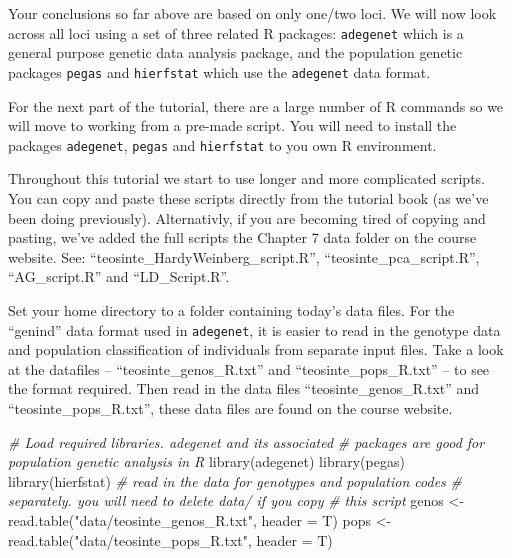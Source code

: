 \documentclass[
]{book}
\makeatletter
\newenvironment{Shaded}{\begin{snugshade}}{\end{snugshade}}
\newcommand{\AttributeTok}[1]{\textcolor[rgb]{0.77,0.63,0.00}{#1}}
\newcommand{\CommentTok}[1]{\textcolor[rgb]{0.56,0.35,0.01}{\textit{#1}}}
\newcommand{\FunctionTok}[1]{\textcolor[rgb]{0.00,0.00,0.00}{#1}}
\newcommand{\NormalTok}[1]{#1}
\newcommand{\OtherTok}[1]{\textcolor[rgb]{0.56,0.35,0.01}{#1}}
\newcommand{\StringTok}[1]{\textcolor[rgb]{0.31,0.60,0.02}{#1}}
\newenvironment{kframe}{%
\medskip{}
\setlength{\fboxsep}{.8em}
 \def\at@end@of@kframe{}%
 \ifinner\ifhmode%
  \def\at@end@of@kframe{\end{minipage}}%
  \begin{minipage}{\columnwidth}%
 \fi\fi%
 \def\FrameCommand##1{\hskip\@totalleftmargin \hskip-\fboxsep
 \colorbox{shadecolor}{##1}\hskip-\fboxsep
     \hskip-\linewidth \hskip-\@totalleftmargin \hskip\columnwidth}%
 \MakeFramed {\advance\hsize-\width
   \@totalleftmargin\z@ \linewidth\hsize
   \@setminipage}}%
 {\par\unskip\endMakeFramed%
 \at@end@of@kframe}
\newenvironment{rmdblock}[1]
  {
  \begin{itemize}
  \renewcommand{\labelitemi}{
    \raisebox{-.7\height}[0pt][0pt]{
      {\setkeys{Gin}{width=3em,keepaspectratio}\texttt{[image: images/\#1]}}
    }
  }
  \setlength{\fboxsep}{1em}
  \begin{kframe}
  \item
  }
  {
  \end{kframe}
  \end{itemize}
  }
\newenvironment{rmdnote}
  {\begin{rmdblock}{note}}
  {\end{rmdblock}}
\makeatother
\begin{document}
Your conclusions so far above are based on only one/two loci. We will now look across all loci using a set of three related R packages: \texttt{adegenet} \citep{adegenet2008} which is a general purpose genetic data analysis package, and the population genetic packages \texttt{pegas} \citep{R-pegas} and \texttt{hierfstat} \citep{R-hierfstat} which use the \texttt{adegenet} data format.

For the next part of the tutorial, there are a large number of R commands so we will move to working from a pre-made script. You will need to install the packages \texttt{adegenet}, \texttt{pegas} and \texttt{hierfstat} to you own R environment.

\begin{rmdnote}
Throughout this tutorial we start to use longer and more complicated scripts. You can copy and paste these scripts directly from the tutorial book (as we've been doing previously). Alternativly, if you are becoming tired of copying and pasting, we've added the full scripts the Chapter 7 data folder on the course website. See: ``teosinte\_HardyWeinberg\_script.R'', ``teosinte\_pca\_script.R'', ``AG\_script.R'' and ``LD\_Script.R''.
\end{rmdnote}

Set your home directory to a folder containing today's data files. For the ``genind'' data format used in \texttt{adegenet}, it is easier to read in the genotype data and population classification of individuals from separate input files. Take a look at the datafiles -- ``teosinte\_genos\_R.txt'' and ``teosinte\_pops\_R.txt'' -- to see the format required. Then read in the data files ``teosinte\_genos\_R.txt'' and ``teosinte\_pops\_R.txt'', these data files are found on the course website.

\begin{Shaded}
\begin{Highlighting}[]
\CommentTok{\# Load required libraries. adegenet and its associated}
\CommentTok{\# packages are good for population genetic analysis in R}
\FunctionTok{library}\NormalTok{(adegenet)}
\FunctionTok{library}\NormalTok{(pegas)}
\FunctionTok{library}\NormalTok{(hierfstat)}
\CommentTok{\# read in the data for genotypes and population codes}
\CommentTok{\# separately. you will need to delete \textquotesingle{}data/\textquotesingle{} if you copy}
\CommentTok{\# this script}
\NormalTok{genos }\OtherTok{\textless{}{-}} \FunctionTok{read.table}\NormalTok{(}\StringTok{"data/teosinte\_genos\_R.txt"}\NormalTok{, }\AttributeTok{header =}\NormalTok{ T)}
\NormalTok{pops }\OtherTok{\textless{}{-}} \FunctionTok{read.table}\NormalTok{(}\StringTok{"data/teosinte\_pops\_R.txt"}\NormalTok{, }\AttributeTok{header =}\NormalTok{ T)}
\end{Highlighting}
\end{Shaded}
\end{document}
